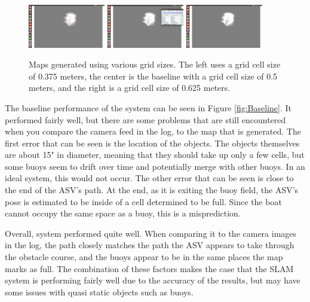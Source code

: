 \documentclass[10pt]{IEEEtran}
\begin{document}
\begin{figure}[!ht]
\centering
		\includegraphics[trim={25cm 15cm 20cm 7cm}, clip, width=0.3\textwidth]{Figures/smallGrid}
		\includegraphics[trim={25cm 15cm 20cm 7cm}, clip, width=0.3\textwidth]{Figures/baseline1}
		\includegraphics[trim={25cm 15cm 20cm 7cm}, clip, width=0.3\textwidth]{Figures/bigGrid}
	\caption{Maps generated using various grid sizes.  The left uses a grid cell size of 
	0.375 meters, the center is the baseline with a grid cell size of 0.5 meters,
	and the right is a grid cell size of 0.625 meters.}
	\label{fig:Grid Comparison}
\end{figure}
The baseline performance of the system can be seen in Figure \ref{fig:Baseline}.  It
performed fairly well, but there are some problems that are still encountered when
you compare the camera feed in the log, to the map that is generated.
The first error that can be seen is the location of the objects.  The objects themselves
are about 15" in diameter, meaning that they should take up only a few cells, but some buoys
seem to drift over time and potentially merge with other buoys. In an ideal system, this
would not occur.  The other error that can be seen is close to the end of the ASV's path.
At the end, as it is exiting the buoy field, the ASV's pose is estimated to
be inside of a cell determined to be full.  Since the boat cannot occupy the same space as
a buoy, this is a misprediction.  

Overall, system performed quite well.  When comparing it to the camera
images in the log, the path closely matches the path the ASV appears to take through the
obstacle course, and the buoys appear to be in the same places the map  marks as full.
The combination of these factors makes the case that the SLAM system is performing fairly
well due to the accuracy of the results, but may have some issues with quasi static objects
such as buoys.
\end{document}
